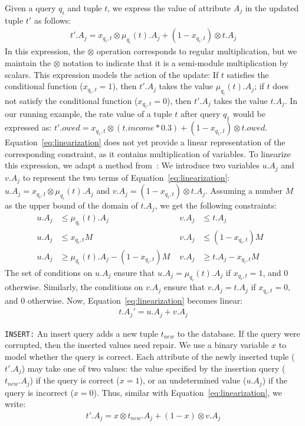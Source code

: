 Given a query $q_i$ and tuple $t$, we express the value of attribute $A_j$ in the updated tuple $t'$ as follows:
\begin{align}
\label{eq:linearization}
t'.A_j = x_{q_i, t}\otimes \mu_{q_i}(t).A_j + (1-x_{q_i, t})\otimes t.A_j 
\end{align} 
In this expression, the $\otimes$ operation corresponds to regular
multiplication, but we maintain the $\otimes$ notation to indicate
that it is a semi-module multiplication by scalars. This expression
models the action of the update: If $t$ satisfies the conditional
function ($x_{q_i, t}=1$), then $t'.A_j$ takes the value
$\mu_{q_i}(t).A_j$; if $t$ does not satisfy the conditional function
($x_{q_i, t}=0$), then $t'.A_j$ takes the value $t.A_j$.
In our running example, the rate value of a tuple $t$ after query $q_1$ would be expressed as:
$t'.owed = x_{q_1, t}\otimes (t.income*0.3) + (1-x_{q_1, t})\otimes t.owed$.
Equation~\eqref{eq:linearization} does not yet provide a linear
representation of the corresponding constraint, as it contains
multiplication of variables. To linearize this expression, we adapt a
method from~\cite{tiresias}: We introduce two variables $u.A_j$ and
$v.A_j$ to represent the two terms of
Equation~\eqref{eq:linearization}: $u.A_j=x_{q_i, t}\otimes
\mu_{q_i}(t).A_j$ and $v.A_j=(1-x_{q_i, t})\otimes t.A_j$. Assuming a
number $M$ as the upper bound of the domain of $t.A_j$, we get the
following constraints:
\begin{align}
\label{eq:uv}
u.A_j &\!\leq\! \mu_{q_i}(t).A_j   &v.A_j &\!\leq\! t.A_j &\nonumber\\
u.A_j &\!\leq\! x_{q_i, t}M        &v.A_j &\!\leq\! (1\!-\!x_{q_i, t})M &\\
u.A_j &\!\geq\! \mu_{q_i}(t).A_j \!-\! (1\!-\! x_{q_i, t})M \phantom{i} 
&v.A_j &\!\geq\! t.A_j \!-\! x_{q_i, t}M &\nonumber
\end{align}
The set of conditions on $u.A_j$ ensure that $u.A_j = \mu_{q_i}(t).A_j$ if $x_{q_i, t}=1$, and $0$ otherwise. Similarly, 
the conditions on $v.A_j$ ensure that $v.A_j = t.A_j$ if $x_{q_i, t}=0$, and $0$ otherwise.  
Now, Equation~\eqref{eq:linearization} becomes linear:
\begin{align}
\label{eq:tnew}
t.A_j' = u.A_j + v.A_j
\end{align}

\noindent\texttt{INSERT:}
An insert query adds a new tuple $t_{new}$ to the database.  If the query were 
corrupted, then the inserted values need repair. We use a binary variable $x$ to model whether the query is correct.  Each attribute of the newly inserted tuple ($t'.A_j$) may take one of two values: the value specified by the insertion query ($t_{new}.A_j$) if the query is correct ($x=1$), or an undetermined value ($u.A_j$) if the query is incorrect ($x=0$).  Thus, similar with Equation~\eqref{eq:linearization}, we write:
\begin{eqnarray}
\label{eq:insert}
t'.A_j = x \otimes t_{new}.A_j + (1-x) \otimes v.A_j 
\end{eqnarray}


